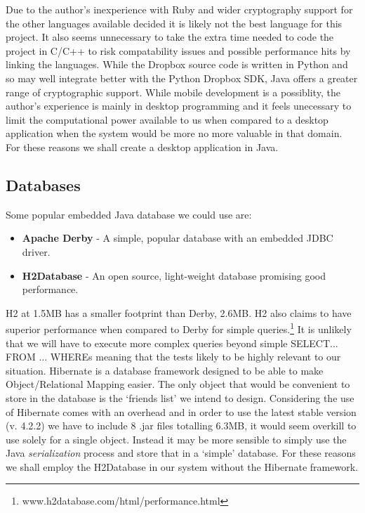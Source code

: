 \documentclass[12pt, titlepage]{article}
\begin{document}
\newline Due to the author's inexperience with Ruby and wider cryptography support for the other languages available decided it is likely not the best language for this project. It also seems unnecessary to take the extra time needed to code the project in C/C++ to risk compatability issues and possible performance hits by linking the languages. While the Dropbox source code is written in Python and so may well integrate better with the Python Dropbox SDK, Java offers a greater range of cryptographic support.
\newline \indent While mobile development is a possiblity, the author's experience is mainly in desktop programming and it feels unecessary to limit the computational power available to us when compared to a desktop application when the system would be more no more valuable in that domain.
\newline \indent For these reasons we shall create a desktop application in Java.

\subsection*{Databases}
Some popular embedded Java database we could use are:
\begin{itemize}
	\item \textbf{Apache Derby} - A simple, popular database with an embedded JDBC driver.
	\item \textbf{H2Database} - An open source, light-weight database promising good performance.
\end{itemize}
H2 at 1.5MB has a smaller footprint than Derby, 2.6MB. H2 also claims to have superior performance when compared to Derby for simple queries.\footnote{www.h2database.com/html/performance.html} It is unlikely that we will have to execute more complex queries beyond simple SELECT... FROM ... WHEREs meaning that the tests likely to be highly relevant to our situation.
\newline \indent Hibernate is a database framework designed to be able to make Object/Relational Mapping easier. The only object that would be convenient to store in the database is the `friends list' we intend to design. Considering the use of Hibernate comes with an overhead and in order to use the latest stable version (v. 4.2.2) we have to include 8 .jar files totalling 6.3MB, it would seem overkill to use solely for a single object. Instead it may be more sensible to simply use the Java \textit{serialization} process and store that in a `simple' database.
\newline \indent For these reasons we shall employ the H2Database in our system without the Hibernate framework.
\end{document}
